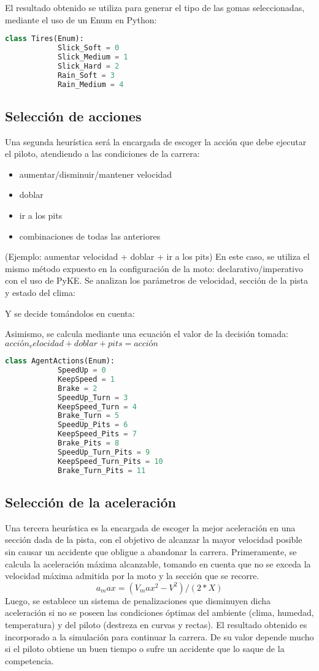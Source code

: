 	El resultado obtenido se utiliza para generar el tipo de las gomas seleccionadas, mediante el uso de un Enum en Python:
	\begin{lstlisting}[language={Python}, label={Script}]
		class Tires(Enum):
		    Slick_Soft = 0
		    Slick_Medium = 1
		    Slick_Hard = 2
		    Rain_Soft = 3
		    Rain_Medium = 4
	\end{lstlisting}


\subsection{Selección de acciones}
	Una segunda heurística será la encargada de escoger la acción que debe ejecutar el piloto, atendiendo a las condiciones de la carrera:
	\begin{itemize}
		\item aumentar/disminuir/mantener velocidad
		\item doblar
		\item ir a los pits
		\item combinaciones de todas las anteriores
	\end{itemize}
  	(Ejemplo: aumentar velocidad + doblar + ir a los pits)
	En este caso, se utiliza el mismo método expuesto en la configuración de la moto: declarativo/imperativo con el uso de PyKE.
	Se analizan los parámetros de velocidad, sección de la pista y estado del clima:


	Y se decide tomándolos en cuenta:


	Asimismo, se calcula mediante una ecuación el valor de la decisión tomada:
	$acción_velocidad + doblar + pits = acción$

	\begin{lstlisting}[language={Python}, label={Script}]
		class AgentActions(Enum):
			SpeedUp = 0
			KeepSpeed = 1
			Brake = 2
			SpeedUp_Turn = 3
			KeepSpeed_Turn = 4
			Brake_Turn = 5
			SpeedUp_Pits = 6
			KeepSpeed_Pits = 7
			Brake_Pits = 8
			SpeedUp_Turn_Pits = 9
			KeepSpeed_Turn_Pits = 10
			Brake_Turn_Pits = 11
	\end{lstlisting}

\subsection{Selección de la aceleración}
	Una tercera heurística es la encargada de escoger la mejor aceleración en una sección dada de la pista, con el objetivo de alcanzar la mayor velocidad posible sin causar un accidente que obligue a abandonar la carrera. 
	Primeramente, se calcula la aceleración máxima alcanzable, tomando en cuenta que no se exceda la velocidad máxima admitida por la moto y la sección que se recorre.
	$$a_max=(V_max^{2}-V^{2})/(2*X)$$
	Luego, se establece un sistema de penalizaciones que disminuyen dicha aceleración si no se poseen las condiciones óptimas del ambiente (clima, humedad, temperatura) y del piloto (destreza en curvas y rectas).
	El resultado obtenido es incorporado a la simulación para continuar la carrera. De su valor depende mucho si el piloto obtiene un buen tiempo o sufre un accidente que lo saque de la competencia.
